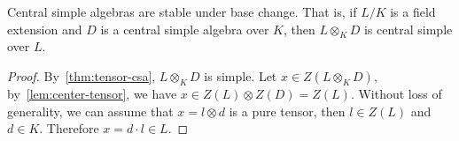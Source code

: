 \begin{corollary}\label{lem:cas-basechange}
  Central simple algebras are stable under base change. That is, if $L/K$ is a field extension and $D$ is a central simple algebra over $K$, then $L\otimes_{K} D$ is central simple over $L$.
  \leanok
\end{corollary}

\begin{proof}
  By~\cref{thm:tensor-csa}, $L\otimes_{K} D$ is simple. Let $x\in Z\left(L\otimes_{K}D\right)$, by~\cref{lem:center-tensor}, we have $x\in Z\left(L\right)\otimes Z\left(D\right)=Z\left(L\right)$. Without loss of generality, we can assume that $x = l \otimes d$ is a pure tensor, then $l \in Z\left(L\right)$ and $d \in K$. Therefore $x = d\cdot l \in L$.
\end{proof}

